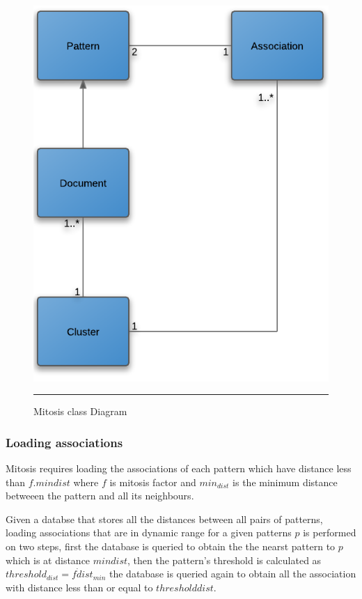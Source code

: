 \begin{figure}[htbp]
	\centering
		\includegraphics{./Figures/Mitosis_6.png}
		\rule{25em}{0.3pt}
	\caption[Mitosis class Diagram]{Mitosis class Diagram}
	\label{fig:mitosis_6}
\end{figure}

\subsubsection{Loading associations} 
Mitosis requires loading the associations of each pattern which have distance less than $f.min{dist}$ where $f$ is mitosis factor and $min_{dist}$ is the minimum distance betweeen the pattern and all its neighbours.

Given a databse that stores all the distances between all pairs of patterns, loading associations that are in dynamic range for a given patterns $p$ is performed on two steps, first the database is queried to obtain the the nearst pattern to $p$ which is at distance $min{dist}$, then the pattern's threshold is calculated as $threshold_{dist} = f \dot dist_{min}$ the database is queried again to obtain all the association with distance less than or equal to $threshold{dist}$.

